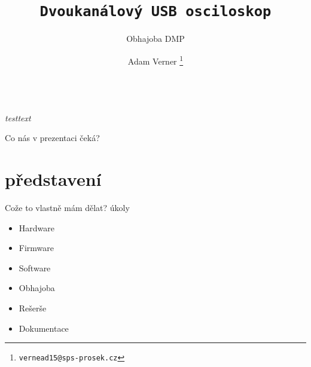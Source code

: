 \documentclass{beamer}
\title{\texttt{\LARGE Dvoukanálový USB osciloskop}}
\subtitle{ Obhajoba DMP }
\author{ Adam Verner \footnote{\texttt{vernead15@sps-prosek.cz}}}
\begin{document}
\begin{frame}
  \maketitle \\
  \textit{testtext}
\end{frame}

\begin{frame}{Co nás v prezentaci čeká?}
  \tableofcontents
\end{frame}

\section{představení}

\begin{frame}{Cože to vlastně mám dělat?}
  úkoly

  \begin{itemize}
  \item Hardware
  \item Firmware
  \item Software
  \item Obhajoba
  \item Rešerše
  \item Dokumentace
  \end{itemize}

\end{frame}
\end{document}
